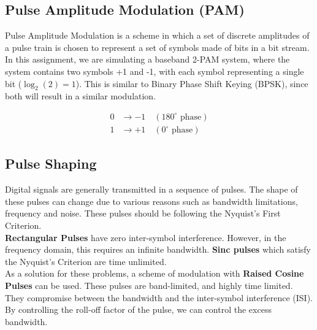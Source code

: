 \documentclass{article}
\begin{document}
        \subsection{Pulse Amplitude Modulation (PAM)}
        Pulse Amplitude Modulation is a scheme in which a set of discrete amplitudes of a pulse train is chosen to represent a set of symbols made of bits in a bit stream.  \\

        In this assignment, we are simulating a baseband 2-PAM system, where the system contains two symbols +1 and -1, with each symbol representing a single bit (\(\log_2(2) = 1\)). This is similar to Binary Phase Shift Keying (BPSK), since both will result in a similar modulation.

        \begin{align*}
            0 &\rightarrow -1 \quad (180^\circ \text{ phase}) \\
            1 &\rightarrow +1 \quad (0^\circ \text{ phase})
        \end{align*}

        \subsection{Pulse Shaping}
        Digital signals are generally transmitted in a sequence of pulses. The shape of these pulses can change due to various reasons such as bandwidth limitations, frequency and noise. These pulses should be following the Nyquist's First Criterion.\\ 

        \textbf{Rectangular Pulses} have zero inter-symbol interference. However, in the frequency domain, this requires an infinite bandwidth. \textbf{Sinc pulses} which satisfy the Nyquist's Criterion are time unlimited. \\

        As a solution for these problems, a scheme of modulation with \textbf{Raised Cosine Pulses} can be used. These pulses are band-limited, and highly time limited. They compromise between the bandwidth and the inter-symbol interference (ISI). By controlling the roll-off factor of the pulse, we can control the excess bandwidth.
\end{document}
